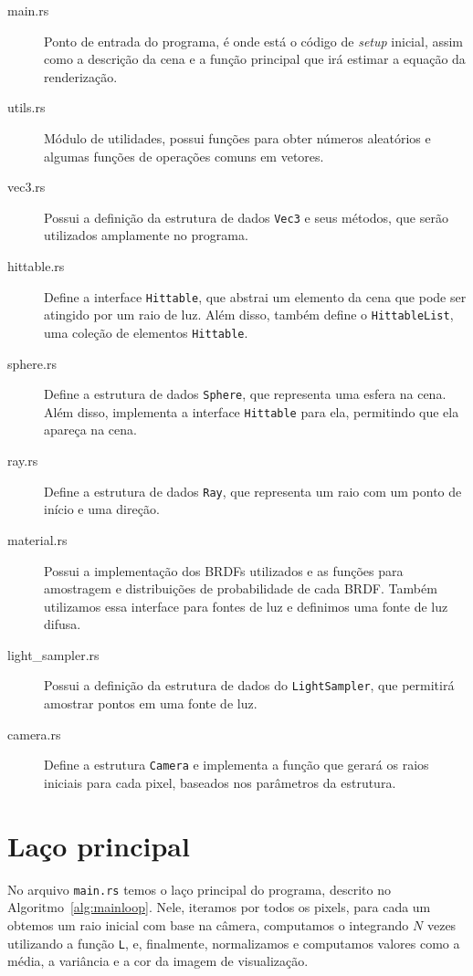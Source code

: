 \begin{description}
  \item[main.rs] Ponto de entrada do programa, é onde está o
código de \emph{setup} inicial, assim como a descrição da cena e a função
principal que irá estimar a equação da renderização.
  \item[utils.rs] Módulo de utilidades, possui funções para obter números
    aleatórios e algumas funções de operações comuns em vetores.
  \item[vec3.rs] Possui a definição da estrutura de dados \texttt{Vec3} e
    seus métodos, que serão utilizados amplamente no programa.
  \item[hittable.rs] Define a interface \texttt{Hittable}, que abstrai um
    elemento da cena que pode ser atingido por um raio de luz. Além disso,
    também define o \texttt{HittableList}, uma coleção de elementos
    \texttt{Hittable}.
  \item[sphere.rs] Define a estrutura de dados \texttt{Sphere}, que representa
    uma esfera na cena. Além disso, implementa a interface \texttt{Hittable}
    para ela, permitindo que ela apareça na cena.
  \item[ray.rs] Define a estrutura de dados \texttt{Ray}, que representa um
    raio com um ponto de início e uma direção.
  \item[material.rs] Possui a implementação dos BRDFs utilizados e as funções
  para amostragem e distribuições de probabilidade de cada BRDF. Também
  utilizamos essa interface para fontes de luz e definimos uma fonte de luz
  difusa.
  \item[light\_sampler.rs] Possui a definição da estrutura de dados do
    \texttt{LightSampler}, que permitirá amostrar pontos em uma fonte de luz. 
  \item[camera.rs] Define a estrutura \texttt{Camera} e implementa a função que
  gerará os raios iniciais para cada pixel, baseados nos parâmetros da
  estrutura.
\end{description}


\section{Laço principal}

No arquivo \texttt{main.rs} temos o laço principal do programa, descrito no
Algoritmo~\ref{alg:mainloop}. Nele, iteramos por todos os pixels, para cada
um obtemos um raio inicial com base na câmera, computamos o integrando $N$ vezes
utilizando a função \texttt{L}, e, finalmente, normalizamos e computamos
valores como a média, a variância e a cor da imagem de visualização.

